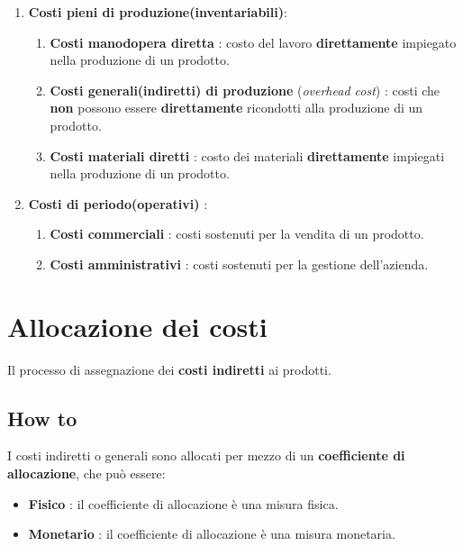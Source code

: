 \documentclass{article}
\begin{document}
\begin{enumerate}
    \item \textbf{Costi pieni di produzione(inventariabili)}:
          \begin{enumerate}
              \item \textbf{Costi manodopera diretta} : costo del lavoro \textbf{direttamente} impiegato nella produzione di un prodotto.
              \item \textbf{Costi generali(indiretti) di produzione} (\textit{overhead cost}) : costi che \textbf{non} possono essere \textbf{direttamente} ricondotti alla produzione di un prodotto.
              \item \textbf{Costi materiali diretti} : costo dei materiali \textbf{direttamente} impiegati nella produzione di un prodotto.
          \end{enumerate}
    \item \textbf{Costi di periodo(operativi)} :
          \begin{enumerate}
              \item \textbf{Costi commerciali} : costi sostenuti per la vendita di un prodotto.
              \item \textbf{Costi amministrativi} : costi sostenuti per la gestione dell’azienda.
          \end{enumerate}
\end{enumerate}
\newpage
\section{Allocazione dei costi}
Il processo di assegnazione dei \textbf{costi indiretti} ai prodotti.
\subsection{How to}
I costi indiretti o generali sono allocati per mezzo di un \textbf{coefficiente di allocazione}, che può essere:
\begin{itemize}
    \item \textbf{Fisico} : il coefficiente di allocazione è una misura fisica.
    \item \textbf{Monetario} : il coefficiente di allocazione è una misura monetaria.
\end{itemize}
\begin{table}[H]
    \setlength{\extrarowheight}{12pt}
\end{table}
\end{document}

